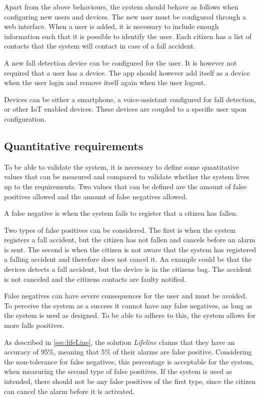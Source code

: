 Apart from the above behaviours, the system should behave as follows when configuring new users and devices. The new user must be configured through a web interface. When a user is added, it is necessary to include enough information such that it is possible to identify the user. Each citizen has a list of contacts that the system will contact in case of a fall accident.

A new fall detection device can be configured for the user. It is however not required that a user has a device. The app should however add itself as a device when the user login and remove itself again when the user logout.

Devices can be either a smartphone, a voice-assistant configured for fall detection, or other IoT enabled devices. These devices are coupled to a specific user upon configuration.

\subsection{Quantitative requirements}\label{sec:q-requirements}
To be able to validate the system, it is necessary to define some quantitative values that can be measured and compared to validate whether the system lives up to the requirements. Two values that can be defined are the amount of false positives allowed and the amount of false negatives allowed.

A false negative is when the system fails to register that a citizen has fallen.
 
Two types of false positives can be considered. The first is when the system registers a fall accident, but the citizen has not fallen and cancels before an alarm is sent. The second is when the citizen is not aware that the system has registered a falling accident and therefore does not cancel it. An example could be that the devices detects a fall accident, but the device is in the citizens bag. The accident is not canceled and the citizens contacts are faulty notified.

False negatives can have severe consequences for the user and must be avoided. To perceive the system as a success it cannot have any false negatives, as long as the system is used as designed. To be able to adhere to this, the system allows for more falls positives.

As described in \ref{sec:lifeLine}, the solution \textit{Lifeline} \cite{AAlert} claims that they have an accuracy of 95\%, meaning that 5\% of their alarms are false positive. Considering the non-tolerance for false negatives, this percentage is acceptable for the system, when measuring the second type of false positives. If the system is used as intended, there should not be any false positives of the first type, since the citizen can cancel the alarm before it is activated.

